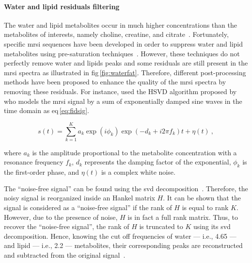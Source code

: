 \paragraph{Water and lipid residuals filtering} The water and lipid metabolites occur in much higher concentrations than the metabolites of interests, namely choline, creatine, and citrate~\cite{Zhu2010,Osorio-Garcia2012}.
Fortunately, specific \ac{mrsi} sequences have been developed in order to suppress water and lipid metabolites using pre-saturation techniques~\cite{Zhu2010}.
However, these techniques do not perfectly remove water and lipids peaks and some residuals are still present in the \ac{mrsi} spectra as illustrated in \ac{fig}\,\ref{fig:waterfat}.
Therefore, different post-processing methods have been proposed to enhance the quality of the \ac{mrsi} spectra by removing these residuals.
For instance, \citeauthor{Kelm2007} used the HSVD algorithm proposed by \citeauthor{Pijnappel1992} who models the \ac{mrsi} signal by a sum of exponentially damped sine waves in the time domain as \acs{eq}\,\eqref{eq:fidsig}.

\begin{equation}
	s(t) = \sum_{k=1}^{K} a_{k}\exp(i \phi_k) \exp( -d_{k} + i 2 \pi f_{k} ) t + \eta(t) \ ,
	\label{eq:fidsig}
\end{equation}

\noindent where $a_k$ is the amplitude proportional to the metabolite concentration with a resonance frequency $f_{k}$, $d_k$ represents the damping factor of the exponential, $\phi_k$ is the first-order phase, and $\eta(t)$ is a complex white noise.

The ``noise-free signal'' can be found using the \ac{svd} decomposition~\cite{Pijnappel1992}.
Therefore, the noisy signal is reorganized inside an Hankel matrix $H$.
It can be shown that the signal is considered as a ``noise-free signal'' if the rank of $H$ is equal to rank $K$.
However, due to the presence of noise, $H$ is in fact a full rank matrix.
Thus, to recover the ``noise-free signal'', the rank of $H$ is truncated to $K$ using its \ac{svd} decomposition.
Hence, knowing the cut off frequencies of water --- i.e., \SI{4.65}{\ppm} --- and lipid --- i.e., \SI{2.2}{\ppm} --- metabolites, their corresponding peaks are reconstructed and subtracted from the original signal~\cite{Laudadio2002}.
	

